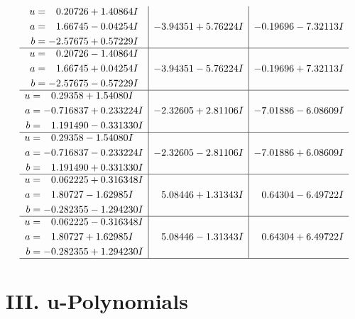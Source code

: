 \documentclass[1p]{elsarticle_modified}
\theoremstyle{definition}
\begin{document}
$$\begin{array}{c|c|c}
\begin{aligned}
u &= \phantom{-}0.20726 + 1.40864 I \\
a &= \phantom{-}1.66745 - 0.04254 I \\
b &= -2.57675 + 0.57229 I\end{aligned}
 & -3.94351 + 5.76224 I & -0.19696 - 7.32113 I \\ \hline\begin{aligned}
u &= \phantom{-}0.20726 - 1.40864 I \\
a &= \phantom{-}1.66745 + 0.04254 I \\
b &= -2.57675 - 0.57229 I\end{aligned}
 & -3.94351 - 5.76224 I & -0.19696 + 7.32113 I \\ \hline\begin{aligned}
u &= \phantom{-}0.29358 + 1.54080 I \\
a &= -0.716837 + 0.233224 I \\
b &= \phantom{-}1.191490 - 0.331330 I\end{aligned}
 & -2.32605 + 2.81106 I & -7.01886 - 6.08609 I \\ \hline\begin{aligned}
u &= \phantom{-}0.29358 - 1.54080 I \\
a &= -0.716837 - 0.233224 I \\
b &= \phantom{-}1.191490 + 0.331330 I\end{aligned}
 & -2.32605 - 2.81106 I & -7.01886 + 6.08609 I \\ \hline\begin{aligned}
u &= \phantom{-}0.062225 + 0.316348 I \\
a &= \phantom{-}1.80727 - 1.62985 I \\
b &= -0.282355 - 1.294230 I\end{aligned}
 & \phantom{-}5.08446 + 1.31343 I & \phantom{-}0.64304 - 6.49722 I \\ \hline\begin{aligned}
u &= \phantom{-}0.062225 - 0.316348 I \\
a &= \phantom{-}1.80727 + 1.62985 I \\
b &= -0.282355 + 1.294230 I\end{aligned}
 & \phantom{-}5.08446 - 1.31343 I & \phantom{-}0.64304 + 6.49722 I\\
 \hline 
 \end{array}$$\newpage
\newpage\renewcommand{\arraystretch}{1}
\centering \section*{ III. u-Polynomials}
\end{document}
